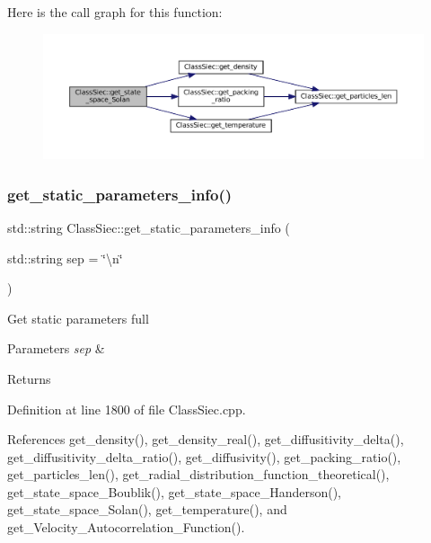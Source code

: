 Here is the call graph for this function\+:
\nopagebreak
\begin{figure}[H]
\begin{center}
\leavevmode
\includegraphics[width=350pt]{classClassSiec_a3a0171519c3557d8edec22edb5978c9c_cgraph}
\end{center}
\end{figure}
\mbox{\label{classClassSiec_aaf3b24bc73d268f151acdff6351214e0}} 
\subsubsection{\texorpdfstring{get\+\_\+static\+\_\+parameters\+\_\+info()}{get\_static\_parameters\_info()}}
{\footnotesize\ttfamily std\+::string Class\+Siec\+::get\+\_\+static\+\_\+parameters\+\_\+info (\begin{DoxyParamCaption}\item[{std\+::string}]{sep = {\ttfamily \char`\"{}\textbackslash{}n\char`\"{}} }\end{DoxyParamCaption})}

Get static parameters full 
\begin{DoxyParams}{Parameters}
{\em sep} & \\
\hline
\end{DoxyParams}
\begin{DoxyReturn}{Returns}

\end{DoxyReturn}


Definition at line 1800 of file Class\+Siec.\+cpp.



References get\+\_\+density(), get\+\_\+density\+\_\+real(), get\+\_\+diffusitivity\+\_\+delta(), get\+\_\+diffusitivity\+\_\+delta\+\_\+ratio(), get\+\_\+diffusivity(), get\+\_\+packing\+\_\+ratio(), get\+\_\+particles\+\_\+len(), get\+\_\+radial\+\_\+distribution\+\_\+function\+\_\+theoretical(), get\+\_\+state\+\_\+space\+\_\+\+Boublik(), get\+\_\+state\+\_\+space\+\_\+\+Handerson(), get\+\_\+state\+\_\+space\+\_\+\+Solan(), get\+\_\+temperature(), and get\+\_\+\+Velocity\+\_\+\+Autocorrelation\+\_\+\+Function().



